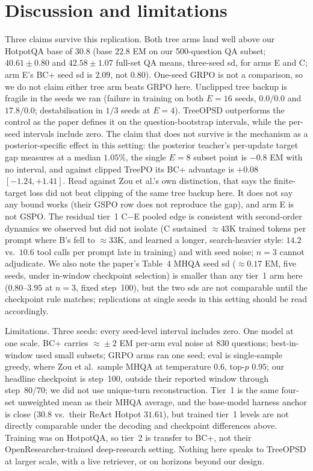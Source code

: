 \documentclass[11pt]{article}
\begin{document}
\section{Discussion and limitations}

Three claims survive this replication. Both tree arms land well above
our HotpotQA base of $30.8$ (base $22.8$ EM on our 500-question QA subset;
$40.61 \pm 0.80$ and $42.58 \pm 1.07$ full-set QA means, three-seed sd,
for arms E and C; arm E's BC+ seed sd is $2.09$, not $0.80$). One-seed
GRPO is not a comparison, so we do not claim either tree arm beats GRPO
here. Unclipped tree backup is fragile in the seeds we ran (failure in
training on both $E{=}16$ seeds, $0.0/0.0$ and $17.8/0.0$; destabilisation
in $1/3$ seeds at $E{=}4$). TreeOPSD outperforms the control as the paper
defines it on the question-bootstrap intervals, while the per-seed
intervals include zero. The claim that does not survive is the mechanism
as a posterior-specific effect in this setting: the posterior teacher's
per-update target gap measures at a median $1.05\%$, the single $E{=}8$
subset point is $-0.8$ EM with no interval, and against clipped TreePO
its BC+ advantage is $+0.08$ $[-1.24, +1.41]$. Read against Zou et al.'s
own distinction, that says the finite-target loss did not beat clipping
of the same tree backup here. It does not say any bound works (their
GSPO row does not reproduce the gap), and arm E is not GSPO. The residual
tier~1 C$-$E pooled edge is consistent with second-order dynamics we
observed but did not isolate (C sustained $\approx\!43$K trained tokens
per prompt where B's fell to $\approx\!33$K, and learned a longer,
search-heavier style: $14.2$ vs.\ $10.6$ tool calls per prompt late in
training) and with seed noise; $n=3$ cannot adjudicate. We also note the
paper's Table~4 MHQA seed sd ($\approx\!0.17$ EM, five seeds, under
in-window checkpoint selection) is smaller than any tier~1 arm here
($0.80$--$3.95$ at $n=3$, fixed step~100), but the two sds are not
comparable until the checkpoint rule matches; replications at single
seeds in this setting should be read accordingly.

Limitations. Three seeds: every seed-level interval includes zero. One
model at one scale. BC+ carries $\approx\!\pm2$ EM per-arm eval noise at
830 questions; best-in-window used small subsets; GRPO arms ran one seed;
eval is single-sample greedy, where Zou et al.\ sample MHQA at
temperature $0.6$, top-$p$ $0.95$; our headline checkpoint is step~100,
outside their reported window through step~80/70; we did not use
unique-turn reconstruction. Tier~1 is the same four-set unweighted mean
as their MHQA average, and the base-model harness anchor is close
($30.8$ vs.\ their ReAct Hotpot $31.61$), but trained tier~1 levels are
not directly comparable under the decoding and checkpoint differences
above. Training was on HotpotQA, so tier~2 is transfer to BC+, not their
OpenResearcher-trained deep-research setting. Nothing here speaks to
TreeOPSD at larger scale, with a live retriever, or on horizons beyond
our design.
\end{document}
